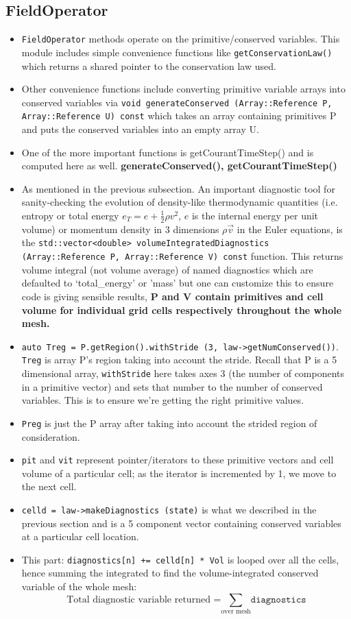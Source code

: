 \documentclass{article}
\begin{document}
\subsection{FieldOperator}
\begin{itemize}
	\item \texttt{FieldOperator} methods operate on the primitive/conserved variables. This module includes simple convenience functions like \texttt{getConservationLaw()} which returns a shared pointer to the conservation law used. 
	\item Other convenience functions include converting primitive variable arrays into conserved variables via \texttt{void generateConserved (Array::Reference P, Array::Reference U) const} which takes an array containing primitives P and puts the conserved variables into an empty array U. 
	\item One of the more important functions is getCourantTimeStep() and is computed here as well. \textbf{generateConserved(), getCourantTimeStep()}
	
	\item As mentioned in the previous subsection. An important diagnostic tool for sanity-checking the evolution of density-like thermodynamic quantities (i.e. entropy or total energy $e_T=e+\frac{1}{2}\rho v^2$, $e$ is the internal energy per unit volume) or momentum density in 3 dimensions $\rho \vec{v}$ in the Euler equations, is the \texttt{std::vector<double> volumeIntegratedDiagnostics (Array::Reference P, Array::Reference V) const} function. This returns volume integral (not volume average) of named diagnostics which are defaulted to `total\_energy' or 'mass' but one can customize this to ensure code is giving sensible results, \textbf{P and V contain primitives and cell volume for individual grid cells respectively throughout the whole mesh.} 
	\item \texttt{auto Treg = P.getRegion().withStride (3, law->getNumConserved())}. \texttt{Treg} is array P's region taking into account the stride. Recall that P is a 5 dimensional array, \texttt{withStride} here takes axes 3 (the number of components in a primitive vector) and sets that number to the number of conserved variables. This is to ensure we're getting the right primitive values.
	\item \texttt{Preg} is just the P array after taking into account the strided region of consideration.
	\item \texttt{pit} and \texttt{vit} represent pointer/iterators to these primitive vectors and cell volume of a particular cell; as the iterator is incremented by 1, we move to the next cell.
	\item  \texttt{celld = law->makeDiagnostics (state)} is what we described in the previous section and is a 5 component vector containing conserved variables at a particular cell location. 
	\item  This part: \texttt{diagnostics[n] += celld[n] * Vol} is looped over all the cells, hence summing the integrated to find the volume-integrated conserved variable of the whole mesh:
$$\text{Total diagnostic variable returned =} \sum_{\text{over mesh}} \texttt{diagnostics}$$
\end{itemize}
\end{document}

